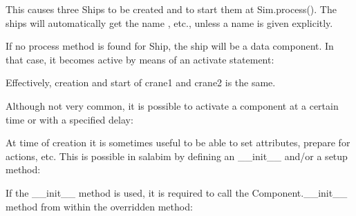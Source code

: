 \documentclass[letterpaper,10pt,english]{sphinxmanual}
\begin{document}
This causes three Ships to be created and to start them at Sim.process().
The ships will automatically get the name , etc., unless a name
is given explicitly.

If no process method is found for Ship, the ship will be a data component.
In that case, it becomes active by means of an activate statement:

%
\begin{sphinxVerbatim}[commandchars=\\\{\}]
 
     
         

  

  
\end{sphinxVerbatim}

Effectively, creation and start of crane1 and crane2 is the same.

Although not very common, it is possible to activate a component at a certain time or with a
specified delay:

%
\begin{sphinxVerbatim}[commandchars=\\\{\}]
\end{sphinxVerbatim}

At time of creation it is sometimes useful to be able to set attributes, prepare for actions, etc.
This is possible in salabim by defining an \_\_init\_\_ and/or a setup method:

If the \_\_init\_\_ method is used, it is required to call the Component.\_\_init\_\_ method from within the
overridden method:
\end{document}
